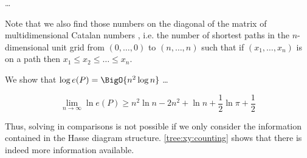 \dots

Note that we also find those numbers on the diagonal of the matrix of
multidimensional Catalan numbers \cite{OEIS:A060854}, i.e. the number of
shortest paths in the \(n\)-dimensional unit grid from \( (0,\ldots,0) \) to
\( (n,\ldots,n) \) such that if \( (x_1,\ldots,x_n) \) is on a path then
\( x_1 \le x_2 \le \ldots \le x_n\).

We show that \( \log e(P) = \BigO{n^2 \log n} \) \dots

\begin{displaymath}
\lim_{n \to \infty} \ln e(P) \ge n^2 \ln n - 2n^2 + \ln n + \frac{1}{2} \ln \pi + \frac{1}{2}
\end{displaymath}


Thus, solving \XY in  comparisons is not possible
if we only consider the information contained in the Hasse diagram structure.
\ref{tree:xy:counting} shows that there is indeed more information available.
